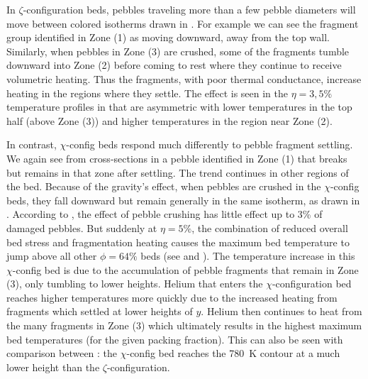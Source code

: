In $\zeta$-configuration beds, pebbles traveling more than a few pebble diameters will move between colored isotherms drawn in . For example we can see the fragment group identified in Zone (1) as moving downward, away from the top wall. Similarly, when pebbles in Zone (3) are crushed, some of the fragments tumble downward into Zone (2) before coming to rest where they continue to receive volumetric heating. Thus the fragments, with poor thermal conductance, increase heating in the regions where they settle. The effect is seen in the $\eta = 3, 5\%$ temperature profiles in  that are asymmetric with lower temperatures in the top half (above Zone (3)) and higher temperatures in the region near Zone (2).

In contrast, $\chi$-config beds respond much differently to pebble fragment settling. We again see from cross-sections in  a pebble identified in Zone (1) that breaks but remains in that zone after settling. The trend continues in other regions of the bed. Because of the gravity's effect, when pebbles are crushed in the $\chi$-config beds, they fall downward but remain generally in the same isotherm, as drawn in . According to , the effect of pebble crushing has little effect up to 3\% of damaged pebbles. But suddenly at $\eta = 5\%$, the combination of reduced overall bed stress and fragmentation heating causes the maximum bed temperature to jump above all other $\phi = 64\%$ beds (see  and ). The temperature increase in this $\chi$-config bed is due to the accumulation of pebble fragments that remain in Zone (3), only tumbling to lower heights. Helium that enters the $\chi$-configuration bed reaches higher temperatures more quickly due to the increased heating from fragments which settled at lower heights of $y$. Helium then continues to heat from the many fragments in Zone (3) which ultimately results in the highest maximum bed temperatures (for the given packing fraction). This can also be seen with comparison between : the $\chi$-config bed reaches the \SI{780}{\kelvin} contour at a much lower height than the $\zeta$-configuration. 




